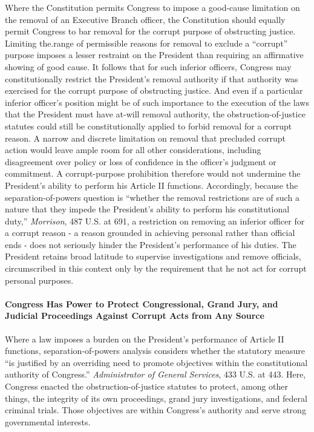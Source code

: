 Where the Constitution permits Congress to impose a good-cause limitation on the removal of an Executive Branch officer, the Constitution should equally permit Congress to bar removal for the corrupt purpose of obstructing justice.
Limiting the.range of permissible reasons for removal to exclude a “corrupt” purpose imposes a lesser restraint on the President than requiring an affirmative showing of good cause.
It follows that for such inferior officers, Congress may constitutionally restrict the President’s removal authority if that authority was exercised for the corrupt purpose of obstructing justice.
And even if a particular inferior officer’s position might be of such importance to the execution of the laws that the President must have at-will removal authority, the obstruction-of-justice statutes could still be constitutionally applied to forbid removal for a corrupt reason.%
A narrow and discrete limitation on removal that precluded corrupt action would leave ample room for all other considerations, including disagreement over policy or loss of confidence in the officer’s judgment or commitment.
A corrupt-purpose prohibition therefore would not undermine the President’s ability to perform his Article II functions.
Accordingly, because the separation-of-powers question is “whether the removal restrictions are of such a nature that they impede the President’s ability to perform his constitutional duty,” \textit{Morrison}, 487 U.S. at 691, a restriction on removing an inferior officer for a corrupt reason - a reason grounded in achieving personal rather than official ends - does not seriously hinder the President’s performance of his duties.
The President retains broad latitude to supervise investigations and remove officials, circumscribed in this context only by the requirement that he not act for corrupt personal purposes.%

\paragraph{Congress Has Power to Protect Congressional, Grand Jury, and Judicial Proceedings Against Corrupt Acts from Any Source}

Where a law imposes a burden on the President’s performance of Article II functions, separation-of-powers analysis considers whether the statutory measure “is justified by an overriding need to promote objectives within the constitutional authority of Congress.”
\textit{Administrator of General Services}, 433 U.S. at 443.
Here, Congress enacted the obstruction-of-justice statutes to protect, among other things, the integrity of its own proceedings, grand jury investigations, and federal criminal trials.
Those objectives are within Congress’s authority and serve strong governmental interests.

